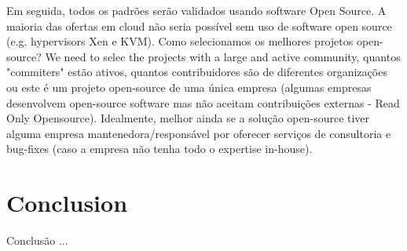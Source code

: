 \documentclass[12pt]{article}
\begin{document}
	Em seguida, todos os padrões serão validados usando software Open Source. A maioria das ofertas em cloud não seria possível sem uso de software open source (e.g. hypervisors Xen e KVM). Como selecionamos os melhores projetos open-source? We need to selec the projects with a large and active community, quantos "commiters" estão ativos, quantos contribuidores são de diferentes organizações ou este é um projeto open-source de uma única empresa (algumas empresas desenvolvem open-source software mas não aceitam contribuições externas - Read Only Opensource). Idealmente, melhor ainda se a solução open-source tiver alguma empresa mantenedora/responsável por oferecer serviços de consultoria e bug-fixes (caso a empresa não tenha todo o expertise in-house). 
	
	\section{Conclusion}
		
	Conclusão ...
	
	
	
	
	
	
	
	
	\cite{Ferrer:2012}
	\cite{Bond:2015}
	\cite{Morris:2016}
	\cite{Fisher:2018}
	
	\nocite{Bond:2015}
	
	\newpage
		
	
	
\end{document}
